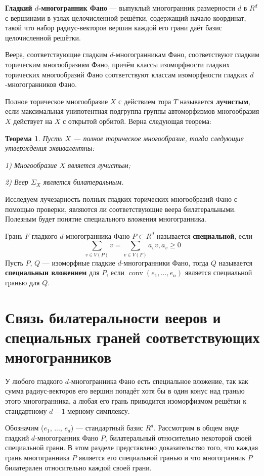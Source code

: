\documentclass[12pt,notitlepage]{article}
\DeclareMathOperator{\conv}{conv}
\newtheorem{theorem}{Теорема}
\begin{document}
	\textbf{Гладкий $d$-многогранник Фано} --- выпуклый многогранник размерности $d$ в $R^d$ с вершинами в узлах целочисленной решётки, содержащий начало координат, такой что набор радиус-векторов вершин каждой его грани даёт базис целочисленной решётки.
	
	Веера, соответствующие гладким $d$-многогранникам Фано, соответствуют гладким торическим многообразиям Фано, причём классы изоморфности гладких торических многообразий Фано соответствуют классам изоморфности гладких $d$-многогранников Фано.
	
	Полное торическое многообразие $X$  с действием тора $T$ называется \textbf{лучистым}, если максимальная унипотентная подгруппа группы автоморфизмов  многообразия $X$ действует на $X$ с открытой орбитой. Верна следующая теорема:
	
	\begin{theorem}
	Пусть $X$ --- полное торическое многообразие, тогда следующие утверждения эквивалентны:
	
	1) Многообразие $X$ является лучистым;
	
	2) Веер $\Sigma_X$ является билатеральным.
	\end{theorem}
	
	Исследуем лучезарность полных гладких торических многообразий Фано с помощью проверки, являются ли соответствующие веера билатеральными. Полезным будет понятие специального вложения многогранника.
	
	Грань $F$ гладкого $d$-многогранника Фано $P \subset R^d$ называется \textbf{специальной}, если
		\[
		\sum_{v \in V(P)} v = \sum_{v \in V(F)} a_v v, a_v \geq 0
		\] 
	Пусть $P$, $Q$ --- изоморфные гладкие $d$-многогранники Фано, тогда $Q$ называется \textbf{специальныи вложением} для $P$, если $\conv (e_1, ..., e_n)$ является специальной гранью для $Q$.
	
	\section{Связь билатеральности вееров и специальных граней соответствующих многогранников}
	
	У любого гладкого $d$-многогранника Фано есть специальное вложение, так как сумма радиус-векторов его вершин попадёт хотя бы в один конус над гранью этого многогранника, а любая его грань приводится изоморфизмом решётки к стандартному $d-1$-мерному симплексу.
	
	Обозначим ($e_1$, ..., $e_d$) --- стандартный базис $R^d$. Рассмотрим в общем виде гладкий $d$-многогранник Фано $P$, билатеральный относительно некоторой своей специальной грани. В этом разделе представлено доказательство того, что каждая грань многогранника $P$ является его специальной гранью и что многогранник $P$ билатерален относительно каждой своей грани.
	
\end{document}
